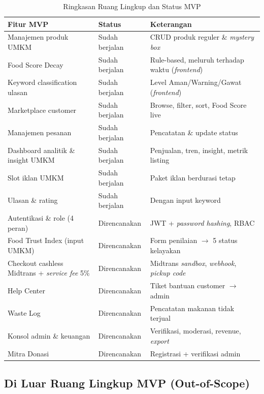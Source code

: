 \begin{table}[htbp]
\centering
\caption{Ringkasan Ruang Lingkup dan Status MVP}
\label{tab:mvp_scope}
\small
\begin{tabularx}{\textwidth}{|>{\RaggedRight\arraybackslash}p{}|l|>{\RaggedRight\arraybackslash}X|}
\hline
\textbf{Fitur MVP} & \textbf{Status} & \textbf{Keterangan} \\
\hline
Manajemen produk UMKM & Sudah berjalan & CRUD produk reguler \& \textit{mystery box} \\
\hline
Food Score Decay & Sudah berjalan & Rule-based, meluruh terhadap waktu (\textit{frontend}) \\
\hline
Keyword classification ulasan & Sudah berjalan & Level Aman/Warning/Gawat (\textit{frontend}) \\
\hline
Marketplace customer & Sudah berjalan & Browse, filter, sort, Food Score live \\
\hline
Manajemen pesanan & Sudah berjalan & Pencatatan \& update status \\
\hline
Dashboard analitik \& insight UMKM & Sudah berjalan & Penjualan, tren, insight, metrik listing \\
\hline
Slot iklan UMKM & Sudah berjalan & Paket iklan berdurasi tetap \\
\hline
Ulasan \& rating & Sudah berjalan & Dengan input keyword \\
\hline
Autentikasi \& role (4 peran) & Direncanakan & JWT + \textit{password hashing}, RBAC \\
\hline
Food Trust Index (input UMKM) & Direncanakan & Form penilaian $\rightarrow$ 5 status kelayakan \\
\hline
Checkout cashless Midtrans + \textit{service fee} 5\% & Direncanakan & Midtrans \textit{sandbox}, \textit{webhook}, \textit{pickup code} \\
\hline
Help Center & Direncanakan & Tiket bantuan customer $\rightarrow$ admin \\
\hline
Waste Log & Direncanakan & Pencatatan makanan tidak terjual \\
\hline
Konsol admin \& keuangan & Direncanakan & Verifikasi, moderasi, revenue, \textit{export} \\
\hline
Mitra Donasi & Direncanakan & Registrasi + verifikasi admin \\
\hline
\end{tabularx}
\end{table}

\subsection{Di Luar Ruang Lingkup MVP (Out-of-Scope)}

